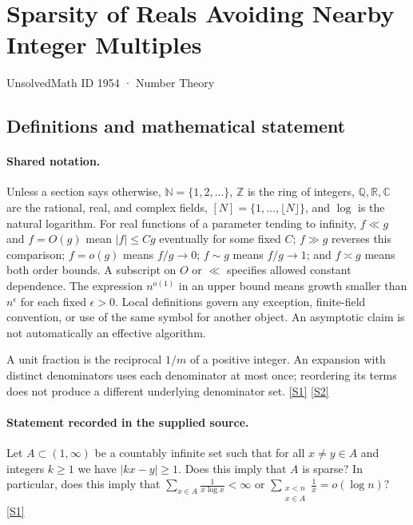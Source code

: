 \documentclass[11pt,a4paper]{article}
\newcommand{\N}{\mathbb{N}}
\newcommand{\Z}{\mathbb{Z}}
\newcommand{\Q}{\mathbb{Q}}
\newcommand{\R}{\mathbb{R}}
\newcommand{\C}{\mathbb{C}}
\newcommand{\sref}[2]{\hyperlink{source:#1:#2}{[S#2]}}
\begin{document}

\setcounter{section}{1953}

\section{Sparsity of Reals Avoiding Nearby Integer Multiples}\label{1954}

{\small\sffamily UnsolvedMath ID 1954 · Number Theory}

\subsection{Definitions and mathematical statement}

\paragraph{Shared notation.}Unless a section says otherwise, $\N=\{1,2,\ldots\}$,
$\Z$ is the ring of integers, $\Q,\R,\C$ are the rational, real, and complex
fields, $[N]=\{1,\ldots,\lfloor N\rfloor\}$, and $\log$ is the natural
logarithm. For real functions of a parameter tending to infinity,
$f\ll g$ and $f=O(g)$ mean $|f|\leq Cg$ eventually for some fixed $C$;
$f\gg g$ reverses this comparison; $f=o(g)$ means $f/g\to0$;
$f\sim g$ means $f/g\to1$; and $f\asymp g$ means both order bounds.
A subscript on $O$ or $\ll$ specifies allowed constant dependence.
The expression $n^{o(1)}$ in an upper bound means growth smaller than
$n^\epsilon$ for each fixed $\epsilon>0$. Local definitions govern any
exception, finite-field convention, or use of the same symbol for another
object. An asymptotic claim is not automatically an effective algorithm.



A unit fraction is the reciprocal $1/m$ of a positive integer. An expansion with distinct denominators uses each denominator at most once; reordering its terms does not produce a different underlying denominator set. \sref{1954}{1} \sref{1954}{2}

\paragraph{Statement recorded in the supplied source.}
Let $A\subset (1,\infty)$ be a countably infinite set such that for all $x\neq y\in A$ and integers $k\geq 1$ we have $  \lvert kx -y\rvert \geq 1. $ Does this imply that $A$ is sparse? In particular, does this imply that $ \sum_{x\in A}\frac{1}{x\log x}<\infty $ or $ \sum_{\substack{x <n\\ x\in A}}\frac{1}{x}=o(\log n)? $ \sref{1954}{1}
\end{document}
